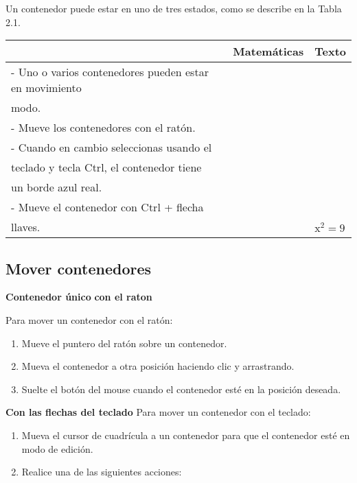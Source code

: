 Un contenedor puede estar en uno de tres estados, como se describe en la Tabla 2.1.



\begin{center}
\begin{tabular}{|l|l|l|}
	\hline
	& Matemáticas & Texto \\
	\hline
	- Uno o varios contenedores pueden estar en movimiento & & \\
	modo. & & \\
	- Mueve los contenedores con el ratón. & & \\
	- Cuando en cambio seleccionas usando el & & \\
	teclado y tecla Ctrl, el contenedor tiene & & \\
	un borde azul real. & & \\
	- Mueve el contenedor con Ctrl + flecha & & \\
	llaves. & & $\mathrm{x}^{2}=9$ \\
	\hline
\end{tabular}
\end{center}

\subsection{Mover contenedores}
\textbf{Contenedor único}
\textbf{con el raton}

Para mover un contenedor con el ratón:
\begin{enumerate}
  \item Mueve el puntero del ratón sobre un contenedor.

\item Mueva el contenedor a otra posición haciendo clic y arrastrando.

\item Suelte el botón del mouse cuando el contenedor esté en la posición deseada.
\end{enumerate}

\textbf{Con las flechas del teclado}
Para mover un contenedor con el teclado:

\begin{enumerate}
	\item Mueva el cursor de cuadrícula a un contenedor para que el contenedor esté en modo de edición.
	
	\item Realice una de las siguientes acciones:
	
\end{enumerate}

